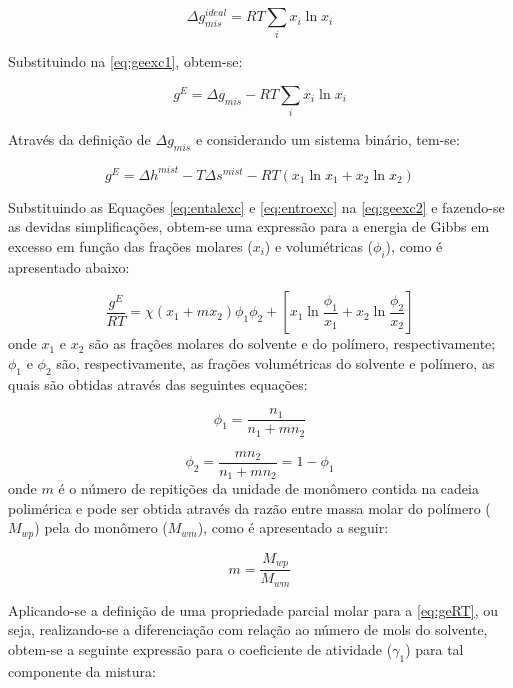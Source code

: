 \begin{equation}
\Delta g_{mis}^{ideal} = RT\sum_ix_i\ln x_i
\end{equation}

Substituindo na \autoref{eq:geexc1}, obtem-se:

\begin{equation}
g^E = \Delta g_{mis} - RT\sum_ix_i\ln x_i
\end{equation}

Através da definição de $\Delta g_{mis}$ e considerando um sistema binário,
tem-se:

\begin{equation}\label{eq:geexc2}
g^E = \Delta h^{mist} - T\Delta s^{mist} - RT\left( x_1\ln x_1 + x_2\ln x_2
\right)
\end{equation}

Substituindo as Equações \ref{eq:entalexc} e \ref{eq:entroexc} na
\autoref{eq:geexc2} e fazendo-se as devidas simplificações, obtem-se uma
expressão para a energia de Gibbs em excesso em função das frações molares
($x_i$) e volumétricas ($\phi_i$), como é apresentado abaixo:

\begin{equation}\label{eq:geRT}
\frac{g^E}{RT} = \chi\left(x_1 + mx_2\right)\phi_1\phi_2 +
\left[x_1\ln\frac{\phi_1}{x_1} + x_2\ln\frac{\phi_2}{x_2}\right]
\end{equation}
onde $x_1$ e $x_2$ são as frações molares do solvente e do polímero,
respectivamente; $\phi_1$ e $\phi_2$ são, respectivamente, as frações
volumétricas do solvente e polímero, as quais são obtidas através das
seguintes equações:

\begin{equation}\label{eq:fracvap}
\phi_1 = \frac{n_1}{n_1 + mn_2}
\end{equation}

\begin{equation}
\phi_2 = \frac{mn_2}{n_1 + mn_2} = 1 - \phi_1
\end{equation}
onde $m$ é o número de repitições da unidade de monômero contida na cadeia
polimérica e pode ser obtida através da razão entre massa molar do polímero
($M_{wp}$) pela do monômero ($M_{wm}$), como é apresentado a seguir:

\begin{equation}
m = \frac{M_{wp}}{M_{wm}}
\end{equation}

 Aplicando-se a definição de uma
propriedade parcial molar para a \autoref{eq:geRT}, ou seja, realizando-se a
diferenciação com relação ao número de mols do solvente, obtem-se
a seguinte expressão para o coeficiente de atividade ($\gamma_1$) para tal
componente da mistura:


